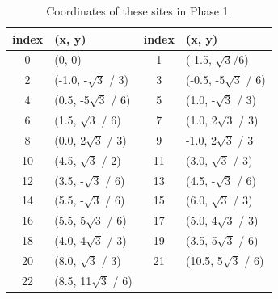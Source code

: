 \documentclass[aps,prb,reprint,amsfonts,amsmath,amssymb,showpacs,groupedaddress,superscriptaddress]{revtex4-1}
\begin{document}
\begin{table}[h]
    \centering
    \begin{tabular}{c | l | c | l}
        \hline
        index & (x, y) & index & (x, y) \\
        \hline
        0 & (0, 0) & 1 & (-1.5, $\sqrt{3} / 6$) \\
        \hline
        2 & (-1.0, -$\sqrt{3}$ / 3) & 3 & (-0.5, -5$\sqrt{3}$ / 6) \\
        \hline
        4 & (0.5, -5$\sqrt{3}$ / 6) & 5 & (1.0, -$\sqrt{3}$ / 3) \\
        \hline
        6 & (1.5, $\sqrt{3}$ / 6) & 7 & (1.0, 2$\sqrt{3}$ / 3) \\
        \hline
        8 & (0.0, 2$\sqrt{3}$ / 3) & 9 & -1.0, 2$\sqrt{3}$ / 3 \\
        \hline
        10 & (4.5, $\sqrt{3}$ / 2) & 11 & (3.0, $\sqrt{3}$ / 3) \\
        \hline
        12 & (3.5, -$\sqrt{3}$ / 6) & 13 & (4.5, -$\sqrt{3}$ / 6) \\
        \hline
        14 & (5.5, -$\sqrt{3}$ / 6) & 15 & (6.0, $\sqrt{3}$ / 3) \\
        \hline
        16 & (5.5, 5$\sqrt{3}$ / 6) & 17 & (5.0, 4$\sqrt{3}$ / 3) \\
        \hline
        18 & (4.0, 4$\sqrt{3}$ / 3) & 19 & (3.5, 5$\sqrt{3}$ / 6) \\
        \hline
        20 & (8.0, $\sqrt{3}$ / 3) & 21 & (10.5, 5$\sqrt{3}$ / 6) \\
        \hline
        22 & (8.5, 11$\sqrt{3}$ / 6) & & \\
        \hline
    \end{tabular}
    \caption{\label{tab:Coordinates}Coordinates of these sites in Phase 1.}
\end{table}



\end{document}
